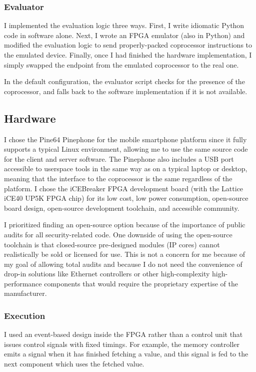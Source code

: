 \subsubsection{Evaluator}
I implemented the evaluation logic three ways. First, I write idiomatic Python code in software alone. Next, I wrote an FPGA emulator (also in Python) and modified the evaluation logic to send properly-packed coprocessor instructions to the emulated device. Finally, once I had finished the hardware implementation, I simply swapped the endpoint from the emulated coprocessor to the real one.

In the default configuration, the evaluator script checks for the presence of the coprocessor, and falls back to the software implementation if it is not available.

\subsection{Hardware}\label{sec:hw}
I chose the Pine64 Pinephone\cite{Pinephone} for the mobile smartphone platform since it fully supports a typical Linux environment, allowing me to use the same source code for the client and server software. The Pinephone also includes a USB port accessible to userspace tools in the same way as on a typical laptop or desktop, meaning that the interface to the coprocessor is the same regardless of the platform. I chose the iCEBreaker FPGA development board\cite{iCEBreaker} (with the Lattice iCE40 UP5K FPGA chip\cite{LatticePage}) for its low cost, low power consumption, open-source board design, open-source development toolchain, and accessible community.

I prioritized finding an open-source option because of the importance of public audits for all security-related code. One downside of using the open-source toolchain is that closed-source pre-designed modules (IP cores) cannot realistically be sold or licensed for use. This is not a concern for me because of my goal of allowing total audits and because I do not need the convenience of drop-in solutions like Ethernet controllers or other high-complexity high-performance components that would require the proprietary expertise of the manufacturer.

\subsubsection{Execution}
I used an event-based design inside the FPGA rather than a control unit that issues control signals with fixed timings. For example, the memory controller emits a signal when it has finished fetching a value, and this signal is fed to the next component which uses the fetched value.

